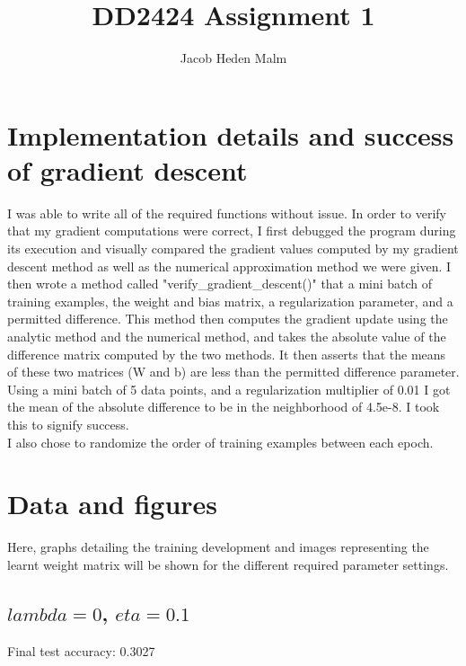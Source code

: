 \documentclass[11pt,a4paper]{article}
\author{Jacob Heden Malm}
\title{DD2424 Assignment 1}
\begin{document}
\maketitle

\section{Implementation details and success of gradient descent}

I was able to write all of the required functions without issue. In order to verify that my gradient computations were correct, I first debugged the program during its execution and visually compared the gradient values computed by my gradient descent method as well as the numerical approximation method we were given. I then wrote a method called "verify\_gradient\_descent()" that a mini batch of training examples, the weight and bias matrix, a regularization parameter, and a permitted difference. This method then computes the gradient update using the analytic method and the numerical method, and takes the absolute value of the difference matrix computed by the two methods. It then asserts that the means of these two matrices (W and b) are less than the permitted difference parameter. Using a mini batch of 5 data points, and a regularization multiplier of 0.01 I got the mean of the absolute difference to be in the neighborhood of 4.5e-8. I took this to signify success.\\

I also chose to randomize the order of training examples between each epoch.

\section{Data and figures}
Here, graphs detailing the training development and images representing the learnt weight matrix will be shown for the different required parameter settings.

\subsection{$lambda=0$, $eta=0.1$}
Final test accuracy: 0.3027
\end{document}
